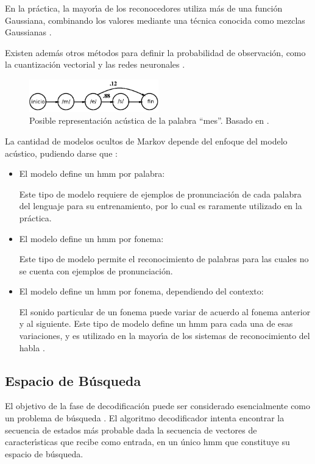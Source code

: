 \begin{enumerate}[A)]
	En la pr\'actica, la mayor{\'\i}a de los reconocedores utiliza m\'as de una funci\'on Gaussiana, combinando
	los valores mediante una t\'ecnica conocida como mezclas Gaussianas \cite{huang-handbook10}.

	Existen adem\'as otros m\'etodos para definir la probabilidad de observaci\'on, como la cuantizaci\'on
	vectorial \cite{Burton1983} y las redes neuronales \cite{KristineApplying1995}.

\end{enumerate}

\begin{figure}[H] 
\centering
\includegraphics[width=0.5\textwidth]{./graphics/hmm_palabra.png}
\caption{Posible representaci\'on ac\'ustica de la palabra ``mes''. Basado en \cite{Jurafsky}.}
\label{figure:hmm-palabra}
\end{figure}

La cantidad de modelos ocultos de Markov depende del enfoque del modelo ac\'ustico, pudiendo darse 
que \cite{Livescu2012}:

\begin{itemize}
 	\item El modelo define un \gls{hmm} por palabra:


 		Este tipo de modelo requiere de ejemplos de pronunciaci\'on de cada palabra del lenguaje para 
 		su entrenamiento, por lo cual es raramente utilizado en la pr\'actica.
 	\item El modelo define un \gls{hmm} por fonema:


 		Este tipo de modelo permite el reconocimiento
 		de palabras para las cuales no se cuenta con ejemplos de pronunciaci\'on.
 	\item El modelo define un \gls{hmm} por fonema, dependiendo del contexto:


 		El sonido particular de un fonema puede variar de acuerdo al fonema anterior y al siguiente.
 		Este tipo de modelo define un \gls{hmm} para cada una de esas variaciones, y es utilizado
 		en la mayor{\'\i}a de los sistemas de reconocimiento del habla \cite{Odell95theuse}.
 \end{itemize}  

\subsection{Espacio de B\'usqueda}
El objetivo de la fase de decodificaci\'on puede ser considerado esencialmente como un problema de 
b\'usqueda \cite{huang-handbook10}.
El algoritmo decodificador intenta encontrar la secuencia de estados m\'as probable dada la secuencia de
vectores de caracter{\'\i}sticas que recibe como entrada, en un \'unico \gls{hmm} que constituye su 
espacio de b\'usqueda.

